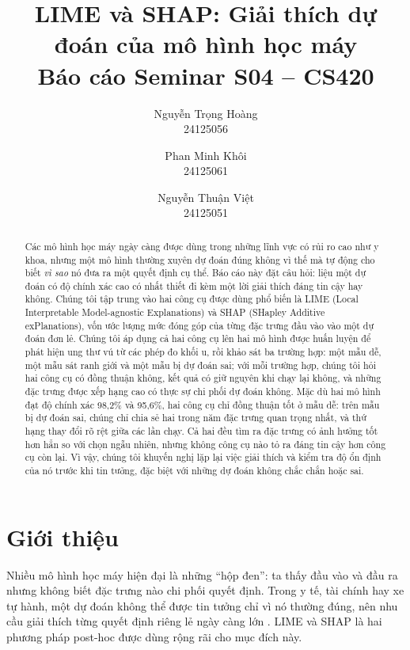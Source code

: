 \documentclass[11pt,a4paper]{article}
\title{\textbf{LIME và SHAP: Giải thích dự đoán của mô hình học máy}\\[2pt]\large Báo cáo Seminar S04 -- CS420}
\author{%
  Nguyễn Trọng Hoàng\\ \small 24125056 \and
  Phan Minh Khôi\\ \small 24125061 \and
  Nguyễn Thuận Việt\\ \small 24125051%
}
\date{}
\begin{document}
\maketitle

\begin{abstract}
Các mô hình học máy ngày càng được dùng trong những lĩnh vực có rủi ro cao
như y khoa, nhưng một mô hình thường xuyên dự đoán đúng không vì thế mà tự
động cho biết \emph{vì sao} nó đưa ra một quyết định cụ thể. Báo cáo này đặt
câu hỏi: liệu một dự đoán có độ chính xác cao có nhất thiết đi kèm một lời
giải thích đáng tin cậy hay không. Chúng tôi tập trung vào hai công cụ được
dùng phổ biến là LIME (Local Interpretable Model-agnostic Explanations) và
SHAP (SHapley Additive exPlanations), vốn ước lượng mức đóng góp của từng
đặc trưng đầu vào vào một dự đoán đơn lẻ. Chúng tôi áp dụng cả hai công cụ
lên hai mô hình được huấn luyện để phát hiện ung thư vú từ các phép đo khối
u, rồi khảo sát ba trường hợp: một mẫu dễ, một mẫu sát ranh giới và một mẫu
bị dự đoán sai; với mỗi trường hợp, chúng tôi hỏi hai công cụ có đồng thuận
không, kết quả có giữ nguyên khi chạy lại không, và những đặc trưng được xếp
hạng cao có thực sự chi phối dự đoán không. Mặc dù hai mô hình đạt độ chính
xác 98,2\% và 95,6\%, hai công cụ chỉ đồng thuận tốt ở mẫu dễ: trên mẫu bị
dự đoán sai, chúng chỉ chia sẻ hai trong năm đặc trưng quan trọng nhất, và
thứ hạng thay đổi rõ rệt giữa các lần chạy. Cả hai đều tìm ra đặc trưng có
ảnh hưởng tốt hơn hẳn so với chọn ngẫu nhiên, nhưng không công cụ nào tỏ ra
đáng tin cậy hơn công cụ còn lại. Vì vậy, chúng tôi khuyến nghị lặp lại việc
giải thích và kiểm tra độ ổn định của nó trước khi tin tưởng, đặc biệt với
những dự đoán không chắc chắn hoặc sai.
\end{abstract}

\section{Giới thiệu}

Nhiều mô hình học máy hiện đại là những ``hộp đen'': ta thấy đầu vào và đầu
ra nhưng không biết đặc trưng nào chi phối quyết định. Trong y tế, tài chính
hay xe tự hành, một dự đoán không thể được tin tưởng chỉ vì nó thường đúng,
nên nhu cầu giải thích từng quyết định riêng lẻ ngày càng lớn
\cite{ribeiro}\cite{mersha}. LIME \cite{ribeiro} và SHAP \cite{lundberg} là
hai phương pháp post-hoc được dùng rộng rãi cho mục đích này.
\end{document}

